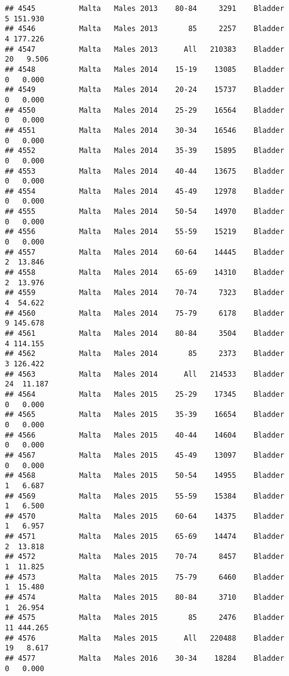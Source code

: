 \documentclass[
]{article}
\begin{document}
\begin{verbatim}
## 4545          Malta   Males 2013    80-84     3291    Bladder      5 151.930
## 4546          Malta   Males 2013       85     2257    Bladder      4 177.226
## 4547          Malta   Males 2013      All   210383    Bladder     20   9.506
## 4548          Malta   Males 2014    15-19    13085    Bladder      0   0.000
## 4549          Malta   Males 2014    20-24    15737    Bladder      0   0.000
## 4550          Malta   Males 2014    25-29    16564    Bladder      0   0.000
## 4551          Malta   Males 2014    30-34    16546    Bladder      0   0.000
## 4552          Malta   Males 2014    35-39    15895    Bladder      0   0.000
## 4553          Malta   Males 2014    40-44    13675    Bladder      0   0.000
## 4554          Malta   Males 2014    45-49    12978    Bladder      0   0.000
## 4555          Malta   Males 2014    50-54    14970    Bladder      0   0.000
## 4556          Malta   Males 2014    55-59    15219    Bladder      0   0.000
## 4557          Malta   Males 2014    60-64    14445    Bladder      2  13.846
## 4558          Malta   Males 2014    65-69    14310    Bladder      2  13.976
## 4559          Malta   Males 2014    70-74     7323    Bladder      4  54.622
## 4560          Malta   Males 2014    75-79     6178    Bladder      9 145.678
## 4561          Malta   Males 2014    80-84     3504    Bladder      4 114.155
## 4562          Malta   Males 2014       85     2373    Bladder      3 126.422
## 4563          Malta   Males 2014      All   214533    Bladder     24  11.187
## 4564          Malta   Males 2015    25-29    17345    Bladder      0   0.000
## 4565          Malta   Males 2015    35-39    16654    Bladder      0   0.000
## 4566          Malta   Males 2015    40-44    14604    Bladder      0   0.000
## 4567          Malta   Males 2015    45-49    13097    Bladder      0   0.000
## 4568          Malta   Males 2015    50-54    14955    Bladder      1   6.687
## 4569          Malta   Males 2015    55-59    15384    Bladder      1   6.500
## 4570          Malta   Males 2015    60-64    14375    Bladder      1   6.957
## 4571          Malta   Males 2015    65-69    14474    Bladder      2  13.818
## 4572          Malta   Males 2015    70-74     8457    Bladder      1  11.825
## 4573          Malta   Males 2015    75-79     6460    Bladder      1  15.480
## 4574          Malta   Males 2015    80-84     3710    Bladder      1  26.954
## 4575          Malta   Males 2015       85     2476    Bladder     11 444.265
## 4576          Malta   Males 2015      All   220488    Bladder     19   8.617
## 4577          Malta   Males 2016    30-34    18284    Bladder      0   0.000

\end{verbatim}
\end{document}
